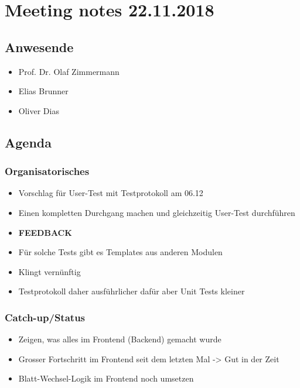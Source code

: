 \hypertarget{meeting-notes-22.11.2018}{%
\section*{Meeting notes 22.11.2018}\label{meeting-notes-22.11.2018}}

\hypertarget{anwesende}{%
\subsection*{Anwesende}\label{anwesende}}

\begin{itemize}

\item
  Prof. Dr. Olaf Zimmermann
\item
  Elias Brunner
\item
  Oliver Dias
\end{itemize}

\hypertarget{agenda}{%
\subsection*{Agenda}\label{agenda}}

\hypertarget{organisatorisches}{%
\subsubsection*{Organisatorisches}\label{organisatorisches}}

\begin{itemize}

\item
  Vorschlag für User-Test mit Testprotokoll am 06.12
\item
  Einen kompletten Durchgang machen und gleichzeitig User-Test
  durchführen 
\item \textbf{FEEDBACK}
\item
  Für solche Tests gibt es Templates aus anderen Modulen
\item
  Klingt vernünftig
\item
  Testprotokoll daher ausführlicher dafür aber Unit Tests kleiner
\end{itemize}

\hypertarget{catch-upux2fstatus}{%
\subsubsection*{Catch-up/Status}\label{catch-upux2fstatus}}

\begin{itemize}

\item
  Zeigen, was alles im Frontend (Backend) gemacht wurde
\item
  Grosser Fortschritt im Frontend seit dem letzten Mal -\textgreater{}
  Gut in der Zeit
\item
  Blatt-Wechsel-Logik im Frontend noch umsetzen
\end{itemize}


